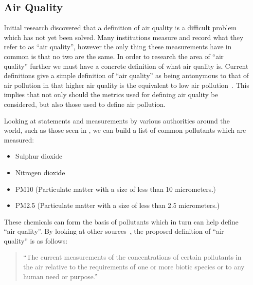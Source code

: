 \subsection{Air Quality}\label{background_air_quality}

Initial research discovered that a definition of air quality is a difficult problem which has not yet been solved. Many institutions measure and record what they refer to as ``air quality'', however the only thing these measurements have in common is that no two are the same. In order to research the area of ``air quality'' further we must have a concrete definition of what air quality is. Current definitions give a simple definition of ``air quality'' as being antonymous to that of air pollution in that higher air quality is the equivalent to low air pollution~\cite{bcaq}. This implies that not only should the metrics used for defining air quality be considered, but also those used to define air pollution.

Looking at statements and measurements by various authorities around the world, such as those seen in \cite{epapollutants,airqualityobjectives,cleanairnavigation,naaqs,whoguidelines}, we can build a list of common pollutants which are measured:


\begin{itemize}
\item Sulphur dioxide
\item Nitrogen dioxide
\item PM10 (Particulate matter with a size of less than 10 micrometers.)
\item PM2.5 (Particulate matter with a size of less than 2.5 micrometers.)
\end{itemize}

These chemicals can form the basis of pollutants which in turn can help define ``air quality''. By looking at other sources~\cite{meaningsofenvironmentalterms}, the proposed definition of ``air quality'' is as follows:

\begin{quote}
``The current measurements of the concentrations of certain pollutants in the air relative to the requirements of one or more biotic species or to any human need or purpose.''
\end{quote}
